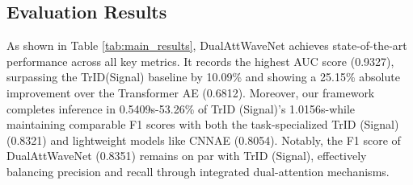 \documentclass[conference]{IEEEtran}
\begin{document}
\subsection{Evaluation Results}

As shown in Table \ref{tab:main_results}, DualAttWaveNet achieves state-of-the-art performance across all key metrics. It records the highest AUC score (0.9327), surpassing the TrID(Signal) baseline by 10.09\% and showing a 25.15\% absolute improvement over the Transformer AE (0.6812). Moreover, our framework completes inference in 0.5409s-53.26\% of TrID (Signal)'s 1.0156s-while maintaining comparable F1 scores with both the task-specialized TrID (Signal) (0.8321) and lightweight models like CNNAE (0.8054). Notably, the F1 score of DualAttWaveNet (0.8351) remains on par with TrID (Signal), effectively balancing precision and recall through integrated dual-attention mechanisms.


\begin{table}[tbp]
    \caption{Performance Comparison of DualAttWaveNet Against Baseline Models}
    \label{tab:main_results}
    \centering
\end{table}
\end{document}
